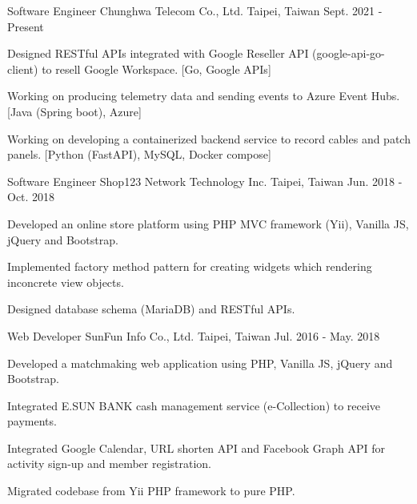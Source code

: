 

\begin{cventries}

  \cventry
    {Software Engineer} %
    {Chunghwa Telecom Co., Ltd.} %
    {Taipei, Taiwan} %
    {Sept. 2021 - Present} %
    {
      \begin{cvitems} %
      \item {Designed RESTful APIs integrated with Google Reseller API (google-api-go-client) to resell Google Workspace. [Go, Google APIs]}
      \item {Working on producing telemetry data and sending events to Azure Event Hubs. [Java (Spring boot), Azure]}
      \item {Working on developing a containerized backend service to record cables and patch panels. [Python (FastAPI), MySQL, Docker compose]}
      \end{cvitems}
    }
  \cventry
    {Software Engineer} %
    {Shop123 Network Technology Inc.} %
    {Taipei, Taiwan} %
    {Jun. 2018 - Oct. 2018} %
    {
      \begin{cvitems} %
        \item {Developed an online store platform using PHP MVC framework (Yii), Vanilla JS, jQuery and Bootstrap.}
        \item {Implemented factory method pattern for creating widgets which rendering inconcrete view objects.}
        \item {Designed database schema (MariaDB) and RESTful APIs.}
      \end{cvitems}
    }

  \cventry
    {Web Developer} %
    {SunFun Info Co., Ltd.} %
    {Taipei, Taiwan} %
    {Jul. 2016 - May. 2018} %
    {
      \begin{cvitems} %
        \item {Developed a matchmaking web application using PHP, Vanilla JS, jQuery and Bootstrap.}
        \item {Integrated E.SUN BANK cash management service (e-Collection) to receive payments.}
        \item {Integrated Google Calendar, URL shorten API and Facebook Graph API for activity sign-up and member registration.}
        \item {Migrated codebase from Yii PHP framework to pure PHP.}
      \end{cvitems}
    }

\end{cventries}
